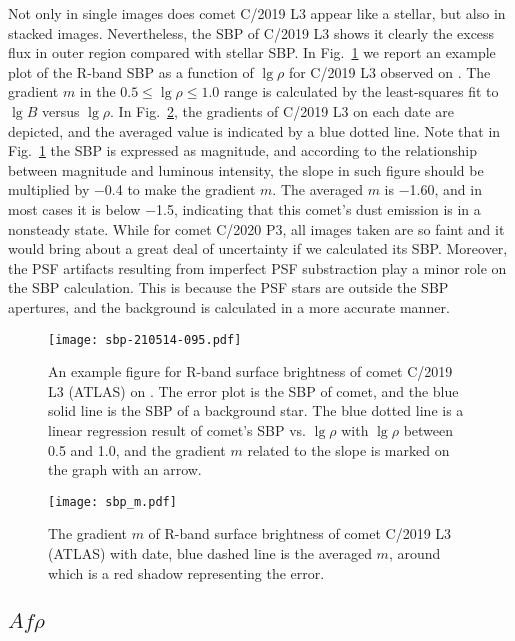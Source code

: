 Not only in single images does comet C/2019 L3 appear like a stellar, but also in stacked images. Nevertheless, the SBP of C/2019 L3 shows it clearly the excess flux in outer region compared with stellar SBP. In Fig.~\ref{fig:sbp} we report an example plot of the R-band SBP as a function of $\lg{\rho}$ for C/2019 L3 observed on . The gradient $m$ in the $0.5 \leqslant \lg{\rho} \leqslant 1.0$ range is calculated by the least-squares fit to $\lg{B}$ versus $\lg{\rho}$. 
In Fig.~\ref{fig:sbp_m}, the gradients of C/2019 L3 on each date are depicted, and the averaged value is indicated by a blue dotted line. 
Note that in Fig.~\ref{fig:sbp} the SBP is expressed as magnitude, and according to the relationship between magnitude and luminous intensity, the slope in such figure should be multiplied by \num{-0.4} to make the gradient $m$. The averaged $m$ is \num{-1.60}, and in most cases it is below \num{-1.5}, indicating that this comet's dust emission is in a nonsteady state. While for comet C/2020 P3, all images taken are so faint and it would bring about a great deal of uncertainty if we calculated its SBP. Moreover, the PSF artifacts resulting from imperfect PSF substraction play a minor role on the SBP calculation. This is because the PSF stars are outside the SBP apertures, and the background is calculated in a more accurate manner. 

\begin{figure}
    \centering
    \texttt{[image: sbp-210514-095.pdf]}
    \caption{An example figure for R-band surface brightness of comet C/2019 L3 (ATLAS) on . The error plot is the SBP of comet, and the blue solid line is the SBP of a background star. The blue dotted line is a linear regression result of comet's SBP vs. $\lg{\rho}$ with $\lg{\rho}$ between 0.5 and 1.0, and the gradient $m$ related to the slope is marked on the graph with an arrow. }
    \label{fig:sbp}
\end{figure}

\begin{figure}
    \centering
    \texttt{[image: sbp\_m.pdf]}
    \caption{The gradient $m$ of R-band surface brightness of comet C/2019 L3 (ATLAS) with date, blue dashed line is the averaged $m$, around which is a red shadow representing the error. }
    \label{fig:sbp_m}
\end{figure}


\subsection{$Af\rho$}

